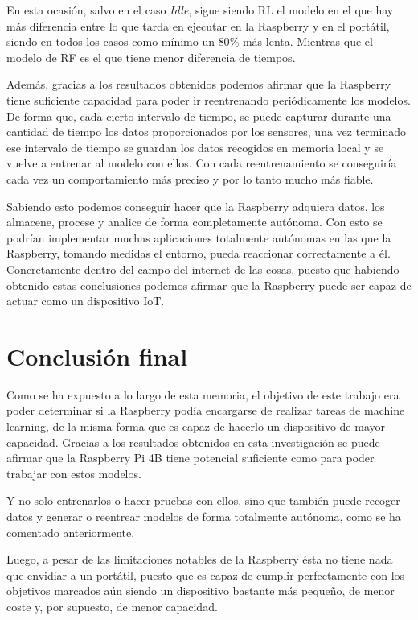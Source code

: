 \documentclass[a4paper, 12pt]{book}
\begin{document}
En esta ocasión, salvo en el caso \textit{Idle}, sigue siendo RL el modelo en el que hay más diferencia entre lo que tarda en ejecutar en la Raspberry y en el portátil, siendo en todos los casos como mínimo un $80\%$ más lenta. Mientras que el modelo de RF es el que tiene menor diferencia de tiempos.

Además, gracias a los resultados obtenidos podemos afirmar que la Raspberry tiene suficiente capacidad para poder ir reentrenando periódicamente los modelos. De forma que, cada cierto intervalo de tiempo, se puede capturar durante una cantidad de tiempo los datos proporcionados por los sensores, una vez terminado ese intervalo de tiempo se guardan los datos recogidos en memoria local y se vuelve a entrenar al modelo con ellos. Con cada reentrenamiento se conseguiría cada vez un comportamiento más preciso y por lo tanto mucho más fiable.

Sabiendo esto podemos conseguir hacer que la Raspberry adquiera datos, los almacene, procese y analice de forma completamente autónoma. Con esto se podrían implementar muchas aplicaciones totalmente autónomas en las que la Raspberry, tomando medidas el entorno, pueda reaccionar correctamente a él. Concretamente dentro del campo del internet de las cosas, puesto que habiendo obtenido estas conclusiones podemos afirmar que la Raspberry puede ser capaz de actuar como un dispositivo IoT.


\section{Conclusión final}
\label{sec:conclusion_final}

Como se ha expuesto a lo largo de esta memoria, el objetivo de este trabajo era poder determinar si la Raspberry podía encargarse de realizar tareas de machine learning, de la misma forma que es capaz de hacerlo un dispositivo de mayor capacidad. Gracias a los resultados obtenidos en esta investigación se puede afirmar que la Raspberry Pi 4B tiene potencial suficiente como para poder trabajar con estos modelos.

Y no solo entrenarlos o hacer pruebas con ellos, sino que también puede recoger datos y generar o reentrear modelos de forma totalmente autónoma, como se ha comentado anteriormente. 

Luego, a pesar de las limitaciones notables de la Raspberry ésta no tiene nada que envidiar a un portátil, puesto que es capaz de cumplir perfectamente con los objetivos marcados aún siendo un dispositivo bastante más pequeño, de menor coste y, por supuesto, de menor capacidad.
\end{document}
